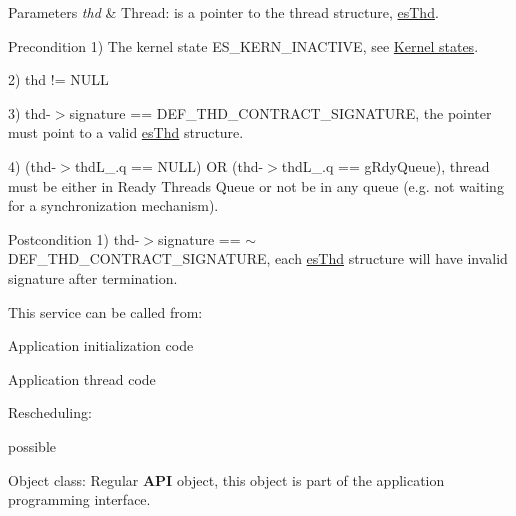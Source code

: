 \begin{DoxyParams}{Parameters}
{\em thd} & Thread\-: is a pointer to the thread structure, \hyperlink{structesThd}{es\-Thd}. \\
\hline
\end{DoxyParams}
\begin{DoxyPrecond}{Precondition}
1) {\ttfamily The kernel state E\-S\-\_\-\-K\-E\-R\-N\-\_\-\-I\-N\-A\-C\-T\-I\-V\-E}, see \hyperlink{states}{Kernel states}. 

2) {\ttfamily thd != N\-U\-L\-L} 

3) {\ttfamily thd-\/$>$signature == D\-E\-F\-\_\-\-T\-H\-D\-\_\-\-C\-O\-N\-T\-R\-A\-C\-T\-\_\-\-S\-I\-G\-N\-A\-T\-U\-R\-E}, the pointer must point to a valid \hyperlink{structesThd}{es\-Thd} structure. 

4) {\ttfamily (thd-\/$>$thd\-L\-\_\-.\-q == N\-U\-L\-L) O\-R (thd-\/$>$thd\-L\-\_\-.\-q == g\-Rdy\-Queue)}, thread must be either in Ready Threads Queue or not be in any queue (e.\-g. not waiting for a synchronization mechanism). 
\end{DoxyPrecond}
\begin{DoxyPostcond}{Postcondition}
1) {\ttfamily thd-\/$>$signature == $\sim$\-D\-E\-F\-\_\-\-T\-H\-D\-\_\-\-C\-O\-N\-T\-R\-A\-C\-T\-\_\-\-S\-I\-G\-N\-A\-T\-U\-R\-E}, each \hyperlink{structesThd}{es\-Thd} structure will have invalid signature after termination. 
\end{DoxyPostcond}
\begin{DoxyParagraph}{This service can be called from\-:}

\begin{DoxyItemize}
\item Application initialization code
\item Application thread code 
\end{DoxyItemize}
\end{DoxyParagraph}
\begin{DoxyParagraph}{Rescheduling\-:}

\begin{DoxyItemize}
\item possible 
\end{DoxyItemize}
\end{DoxyParagraph}
\begin{DoxyParagraph}{Object class\-:}
Regular {\bfseries A\-P\-I} object, this object is part of the application programming interface. 
\end{DoxyParagraph}
